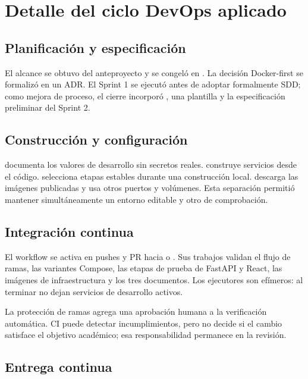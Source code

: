 \section{Detalle del ciclo DevOps aplicado}

\subsection{Planificación y especificación}

El alcance se obtuvo del anteproyecto y se congeló en . La decisión Docker-first se formalizó en un ADR. El Sprint 1 se ejecutó antes de adoptar formalmente SDD; como mejora de proceso, el cierre incorporó , una plantilla y la especificación preliminar del Sprint 2.

\subsection{Construcción y configuración}

 documenta los valores de desarrollo sin secretos reales.  construye servicios desde el código.  selecciona etapas estables durante una construcción local.  descarga las imágenes publicadas y usa otros puertos y volúmenes. Esta separación permitió mantener simultáneamente un entorno editable y otro de comprobación.

\subsection{Integración continua}

El workflow  se activa en pushes y PR hacia  o . Sus trabajos validan el flujo de ramas, las variantes Compose, las etapas de prueba de FastAPI y React, las imágenes de infraestructura y los tres documentos. Los ejecutores son efímeros: al terminar no dejan servicios de desarrollo activos.

La protección de ramas agrega una aprobación humana a la verificación automática. CI puede detectar incumplimientos, pero no decide si el cambio satisface el objetivo académico; esa responsabilidad permanece en la revisión.

\subsection{Entrega continua}

